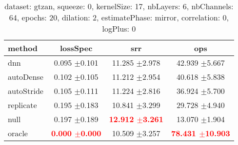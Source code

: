   
\begin{table} 
\begin{center} 
\ 
 \setlength{\tabcolsep}{.16667em} 
\begin{tabular}{lccc} 
method & lossSpec & srr & ops \\ 
\hline 
dnn & 0.095 $\pm$0.101 & 11.285 $\pm$2.978 &  42.939 $\pm$5.667 \\ 
autoDense & 0.102 $\pm$0.105 & 11.212 $\pm$2.954 &  40.618 $\pm$5.838 \\ 
autoStride & 0.105 $\pm$0.111 & 11.224 $\pm$2.816 &  36.924 $\pm$5.700 \\ 
replicate & 0.195 $\pm$0.183 & 10.841 $\pm$3.299 &  29.728 $\pm$4.940 \\ 
null & 0.197 $\pm$0.189 & \textbf{\textcolor{red}{12.912 $\pm$3.261}} &  13.070 $\pm$1.904 \\ 
oracle & \textbf{\textcolor{red}{0.000 $\pm$0.000}} & 10.509 $\pm$3.257 & \textbf{\textcolor{red}{78.431 $\pm$10.903}} \\ 
\end{tabular} 
\end{center} 
\caption{dataset: gtzan, squeeze: 0, kernelSize: 17, nbLayers: 6, nbChannels: 64, epochs: 20, dilation: 2, estimatePhase: mirror, correlation: 0, logPlus: 0} 
\label{dagtSq0Kesi17Nbla6Nbch64Ep20Di2EsphmiCo0Lopl0} 
\end{table} 
 
